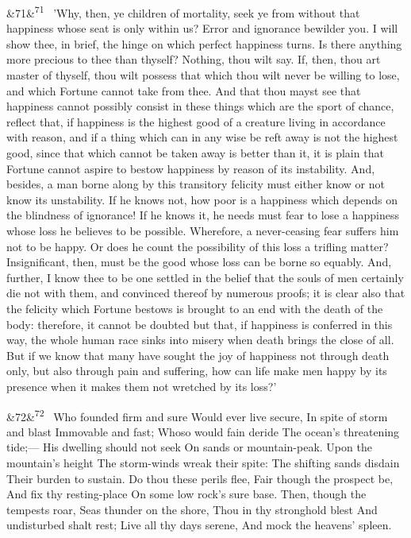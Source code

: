 \documentclass[12pt]{article}
\newcommand{\para}[1][]{\par\noindent\ifx&#1&\else\textsuperscript{\footnotesize #1}~\fi}
\begin{document}
\para[71] 'Why, then, ye children of mortality, seek ye from without that happiness whose seat is only within us? Error and ignorance bewilder you. I will show thee, in brief, the hinge on which perfect happiness turns. Is there anything more precious to thee than thyself? Nothing, thou wilt say. If, then, thou art master of thyself, thou wilt possess that which thou wilt never be willing to lose, and which Fortune cannot take from thee. And that thou mayst see that happiness cannot possibly consist in these things which are the sport of chance, reflect that, if happiness is the highest good of a creature living in accordance with reason, and if a thing which can in any wise be reft away is not the highest good, since that which cannot be taken away is better than it, it is plain that Fortune cannot aspire to bestow happiness by reason of its instability. And, besides, a man borne along by this transitory felicity must either know or not know its unstability. If he knows not, how poor is a happiness which depends on the blindness of ignorance! If he knows it, he needs must fear to lose a happiness whose loss he believes to be possible. Wherefore, a never-ceasing fear suffers him not to be happy. Or does he count the possibility of this loss a trifling matter? Insignificant, then, must be the good whose loss can be borne so equably. And, further, I know thee to be one settled in the belief that the souls of men certainly die not with them, and convinced thereof by numerous proofs; it is clear also that the felicity which Fortune bestows is brought to an end with the death of the body: therefore, it cannot be doubted but that, if happiness is conferred in this way, the whole human race sinks into misery when death brings the close of all. But if we know that many have sought the joy of happiness not through death only, but also through pain and suffering, how can life make men happy by its presence when it makes them not wretched by its loss?'

\para[72] Who founded firm and sure Would ever live secure, In spite of storm and blast Immovable and fast; Whoso would fain deride The ocean's threatening tide;--- His dwelling should not seek On sands or mountain-peak. Upon the mountain's height The storm-winds wreak their spite: The shifting sands disdain Their burden to sustain. Do thou these perils flee, Fair though the prospect be, And fix thy resting-place On some low rock's sure base. Then, though the tempests roar, Seas thunder on the shore, Thou in thy stronghold blest And undisturbed shalt rest; Live all thy days serene, And mock the heavens' spleen.
\end{document}
